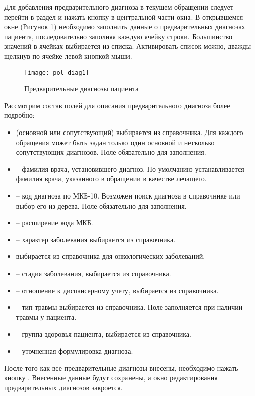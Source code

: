 Для добавления предварительного диагноза в текущем обращении следует перейти в раздел  и нажать кнопку  в центральной части окна. В открывшемся окне (Рисунок \ref{img_pol_diag1}) необходимо заполнить данные о предварительных диагнозах пациента, последовательно заполняя каждую ячейку строки. Большинство значений в ячейках выбирается из списка. Активировать список можно, дважды щелкнув по ячейке левой кнопкой мыши.

 \begin{figure}[ht]\centering
   \texttt{[image: pol\_diag1]}
   \caption{Предварительные диагнозы пациента}
   \label{img_pol_diag1}
 \end{figure}
 
Рассмотрим состав полей для описания предварительного диагноза более подробно:
\begin{itemize}
 \item {} (основной или сопутствующий) выбирается из справочника. Для каждого обращения может быть задан только один основной и несколько сопутствующих диагнозов. Поле обязательно для заполнения.
 \item {} – фамилия врача, установившего диагноз. По умолчанию устанавливается фамилия врача, указанного в обращении в качестве лечащего.
 \item {} – код диагноза по МКБ-10. Возможен поиск диагноза в справочнике или выбор его из дерева. Поле обязательно для заполнения.
 \item {} – расширение кода МКБ.
 \item {} – характер заболевания выбирается из справочника.
 \item {} выбирается из справочника для онкологических заболеваний.
 \item {} – стадия заболевания, выбирается из справочника.
 \item {} – отношение к диспансерному учету, выбирается из справочника.
 \item {} – тип травмы выбирается из справочника. Поле заполняется при наличии травмы у пациента.
 \item {} – группа здоровья пациента, выбирается из справочника.
 \item {} – уточненная формулировка диагноза.
\end{itemize}
  
После того как все предварительные диагнозы внесены, необходимо нажать кнопку . Внесенные данные будут сохранены, а окно редактирования предварительных диагнозов закроется.

